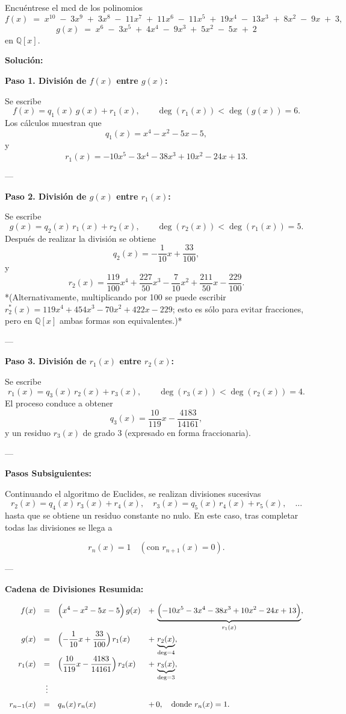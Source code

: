 Encuéntrese el mcd de los polinomios
\[
f(x) \;=\; x^{10} \;-\; 3x^9 \;+\; 3x^8 \;-\; 11x^7 \;+\; 11x^6 \;-\; 11x^5 
        \;+\; 19x^4 \;-\; 13x^3 \;+\; 8x^2 \;-\; 9x \;+\; 3,
\]
\[
g(x) \;=\; x^6 \;-\; 3x^5 \;+\; 4x^4 \;-\; 9x^3 \;+\; 5x^2 \;-\; 5x \;+\; 2
\]
en $\mathbb{Q}[x]$.


\textbf{Solución:} 

\textbf{Paso 1. División de \(f(x)\) entre \(g(x)\):}

Se escribe
\[
f(x)= q_1(x)\,g(x) + r_1(x), \qquad \deg(r_1(x)) < \deg(g(x))=6.
\]
Los cálculos muestran que
\[
q_1(x)= x^4 - x^2 - 5x - 5,
\]
y
\[
r_1(x)= -10x^5 - 3x^4 - 38x^3 + 10x^2 - 24x + 13.
\]

---

\textbf{Paso 2. División de \(g(x)\) entre \(r_1(x)\):}

Se escribe
\[
g(x)= q_2(x)\,r_1(x) + r_2(x), \qquad \deg(r_2(x)) < \deg(r_1(x))=5.
\]
Después de realizar la división se obtiene
\[
q_2(x)= -\frac{1}{10}x + \frac{33}{100},
\]
y
\[
r_2(x)= \frac{119}{100}x^4 + \frac{227}{50}x^3 - \frac{7}{10}x^2 + \frac{211}{50}x - \frac{229}{100}.
\]
*(Alternativamente, multiplicando por 100 se puede escribir \(r_2^*(x)=119x^4+454x^3-70x^2+422x-229\); esto es sólo para evitar fracciones, pero en \(\mathbb{Q}[x]\) ambas formas son equivalentes.)*

---

\textbf{Paso 3. División de \(r_1(x)\) entre \(r_2(x)\):}

Se escribe
\[
r_1(x)= q_3(x)\,r_2(x) + r_3(x), \qquad \deg(r_3(x)) < \deg(r_2(x))=4.
\]
El proceso conduce a obtener
\[
q_3(x)= \frac{10}{119}x - \frac{4183}{14161},
\]
y un residuo \(r_3(x)\) de grado 3 (expresado en forma fraccionaria).

---

\textbf{Pasos Subsiguientes:}

Continuando el algoritmo de Euclides, se realizan divisiones sucesivas
\[
r_2(x)= q_4(x)\,r_3(x) + r_4(x),\quad r_3(x)= q_5(x)\,r_4(x) + r_5(x),\quad \dots
\]
hasta que se obtiene un residuo constante no nulo. En este caso, tras completar todas las divisiones se llega a

\[
r_{n}(x)= 1 \quad (\text{con } r_{n+1}(x)=0).
\]

---

\textbf{Cadena de Divisiones Resumida:}

\[
\begin{array}{rcll}
f(x) &=& \displaystyle \Bigl(x^4 - x^2 - 5x - 5\Bigr)\,g(x) 
  &\displaystyle +\, \underbrace{\Bigl(-10x^5 - 3x^4 - 38x^3 + 10x^2 - 24x + 13\Bigr)}_{r_1(x)},\\[2mm]
g(x) &=& \displaystyle \Bigl(-\frac{1}{10}x + \frac{33}{100}\Bigr)\,r_1(x) 
  &\displaystyle +\, \underbrace{r_2(x)}_{\deg=4},\\[2mm]
r_1(x) &=& \displaystyle \Bigl(\frac{10}{119}x - \frac{4183}{14161}\Bigr)\,r_2(x)
  &\displaystyle +\, \underbrace{r_3(x)}_{\deg=3},\\[2mm]
&\vdots& &\\[2mm]
r_{n-1}(x) &=& q_n(x)\,r_n(x) 
  &\displaystyle +\, 0,\quad\text{donde } r_n(x)=1.
\end{array}
\]

